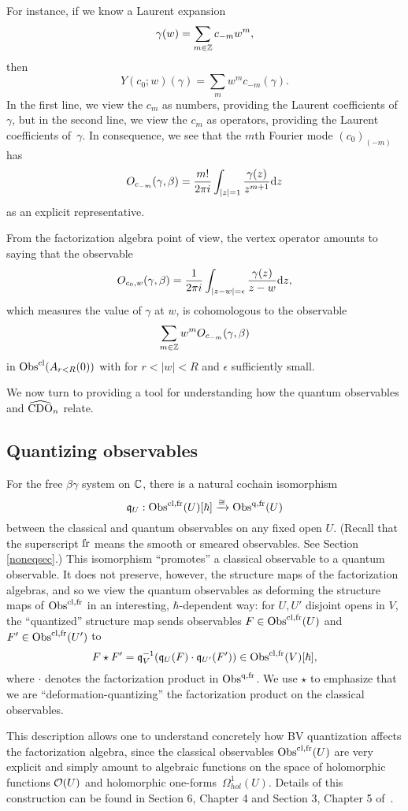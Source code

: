 For instance, if we know a Laurent expansion
\[
\gamma(w) = \sum_{m \in \mathbb Z} c_{-m} w^m,
\]
then
\[
Y(c_0;w)(\gamma) = \sum_m w^m c_{-m}(\gamma).
\]
In the first line, we view the $c_m$ as numbers, providing the Laurent coefficients of $\gamma$,
but in the second line, we view the $c_m$ as operators, providing the Laurent coefficients of~$\gamma$.
In consequence, we see that the $m$th Fourier mode $(c_0)_{(-m)}$ has 
\[
O_{c_{-m}}(\gamma,\beta) = \frac{m!}{2 \pi i} \int_{|z| = 1} \frac{\gamma(z)}{z^{m+1}} {\rm d} z
\]
as an explicit representative.

From the factorization algebra point of view, 
the vertex operator amounts to saying that the observable
\[
O_{c_0,w}(\gamma,\beta) = \frac{1}{2 \pi i} \int_{|z-w| = \epsilon} \frac{\gamma(z)}{z-w} {\rm d} z,
\]
which measures the value of $\gamma$ at $w$, is cohomologous to the observable
\[
\sum_{m \in \mathbb Z} w^m O_{c_{-m}}(\gamma,\beta)
\]
in ${\rm Obs}^{{\rm cl}}(A_{r<R}(0))$ with for $r < |w| < R$ and $\epsilon$ sufficiently small. 

We now turn to providing a tool for understanding how the quantum observables
and $\widehat{\rm CDO}_n$ relate.

\subsection{Quantizing observables}
\label{sec quant map}

For the free $\beta\gamma$ system on $\mathbb C$, 
there is a natural cochain isomorphism 
\[
\frak{q}_U: {\rm Obs}^{{\rm cl},{\rm fr}}(U)[\hbar] \xrightarrow{\cong} {\rm Obs}^{{\rm q},{\rm fr}}(U)
\]
between the classical and quantum observables on any fixed open $U$.
(Recall that the superscript ${\rm fr}$ means the smooth or smeared observables.
See Section \ref{noneqsec}.)
This isomorphism ``promotes'' a classical observable to a quantum observable.
It does not preserve, however, the structure maps of the factorization algebras,
and so we view the quantum observables as deforming the structure maps of ${\rm Obs}^{{\rm cl},{\rm fr}}$ in an interesting, $\hbar$-dependent way:
for $U, U'$ disjoint opens in $V$, the ``quantized'' structure map sends observables 
$F \in {\rm Obs}^{{\rm cl},{\rm fr}}(U)$ and $F' \in {\rm Obs}^{{\rm cl},{\rm fr}}(U')$ to 
\[
F \star F' = \frak{q}_{V}^{-1}(\frak{q}_U(F) \cdot \frak{q}_{U'}(F')) \in {\rm Obs}^{{\rm cl},{\rm fr}}(V)[\hbar],
\]
where $\cdot$ denotes the factorization product in ${\rm Obs}^{{\rm q},{\rm fr}}$.
We use $\star$ to emphasize that we are ``deformation-quantizing'' the factorization product on the classical observables.

This description allows one to understand concretely how BV quantization affects the factorization algebra,
since the classical observables ${\rm Obs}^{{\rm cl},{\rm fr}}(U)$ are very explicit and simply amount to algebraic functions on the space of holomorphic functions $\mathcal O(U)$ and holomorphic one-forms~$\Omega^1_{hol}(U)$.
Details of this construction can be found in Section 6, Chapter 4 and Section 3, Chapter 5 of~\cite{CG}.

